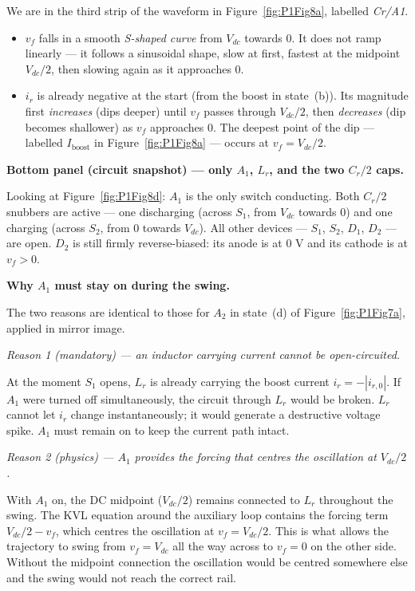 \documentclass[12pt, a4paper]{article}
\def\,{ }%
\newcommand{\Vdc}{V_{dc}}
\newcommand{\vf}{v_f}
\newcommand{\ir}{i_r}
\newcommand{\Lr}{L_r}
\newcommand{\Cr}{C_r}
\newcommand{\figref}[1]{Figure~\ref{#1}}
\begin{document}
We are in the third strip of the waveform in \figref{fig:P1Fig8a},
labelled \textit{Cr/A1}.
\begin{itemize}
    \item $\vf$ falls in a smooth \emph{S-shaped curve} from $\Vdc$
          towards 0.
          It does not ramp linearly --- it follows a sinusoidal shape,
          slow at first, fastest at the midpoint $\Vdc/2$, then
          slowing again as it approaches 0.
    \item $\ir$ is already negative at the start (from the boost in
          state~(b)).
          Its magnitude first \emph{increases} (dips deeper) until
          $\vf$ passes through $\Vdc/2$, then \emph{decreases} (dip
          becomes shallower) as $\vf$ approaches 0.
          The deepest point of the dip --- labelled $I_\text{boost}$
          in \figref{fig:P1Fig8a} --- occurs at $\vf = \Vdc/2$.
\end{itemize}

\medskip
\textbf{Bottom panel (circuit snapshot) --- only $A_1$, $\Lr$, and the
two $\Cr/2$ caps.}

Looking at \figref{fig:P1Fig8d}: $A_1$ is the only switch conducting.
Both $\Cr/2$ snubbers are active --- one discharging (across $S_1$,
from $\Vdc$ towards 0) and one charging (across $S_2$, from 0
towards $\Vdc$).
All other devices --- $S_1$, $S_2$, $D_1$, $D_2$ --- are open.
$D_2$ is still firmly reverse-biased: its anode is at 0\,V and its
cathode is at $\vf > 0$.

\medskip
\textbf{Why $A_1$ must stay on during the swing.}

The two reasons are identical to those for $A_2$ in state~(d) of
\figref{fig:P1Fig7a}, applied in mirror image.

\textit{Reason 1 (mandatory) --- an inductor carrying current cannot
be open-circuited.}

At the moment $S_1$ opens, $\Lr$ is already carrying the boost
current $\ir = -|i_{r,0}|$.
If $A_1$ were turned off simultaneously, the circuit through $\Lr$
would be broken.
$\Lr$ cannot let $\ir$ change instantaneously; it would generate a
destructive voltage spike.
$A_1$ must remain on to keep the current path intact.

\textit{Reason 2 (physics) --- $A_1$ provides the forcing that centres
the oscillation at $\Vdc/2$.}

With $A_1$ on, the DC midpoint ($\Vdc/2$) remains connected to $\Lr$
throughout the swing.
The KVL equation around the auxiliary loop contains the forcing term
$\Vdc/2 - \vf$, which centres the oscillation at $\vf = \Vdc/2$.
This is what allows the trajectory to swing from $\vf = \Vdc$ all the
way across to $\vf = 0$ on the other side.
Without the midpoint connection the oscillation would be centred
somewhere else and the swing would not reach the correct rail.
\end{document}
